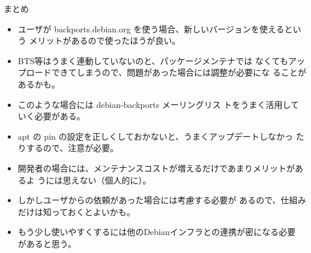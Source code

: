 \begin{frame}[containsverbatim]{まとめ}
\begin{itemize}
\item ユーザが backports.debian.org を使う場合、新しいバージョンを使えるという
メリットがあるので使ったほうが良い。
\item BTS等はうまく連動していないのと、パッケージメンテナでは
なくてもアップロードできてしまうので、問題があった場合には調整が必要にな
ることがあるかも。
\item このような場合には debian-backports メーリングリス
トをうまく活用していく必要がある。
\item apt の pin の設定を正しくしておかないと、うまくアップデートしなかっ
たりするので、注意が必要。

\item 開発者の場合には、メンテナンスコストが増えるだけであまりメリットがあるよ
うには思えない（個人的に）。
\item しかしユーザからの依頼があった場合には考慮する必要が
あるので、仕組みだけは知っておくとよいかも。
\item もう少し使いやすくするには他のDebianインフラとの連携が密になる必要
      があると思う。
\end{itemize}

\end{frame}


